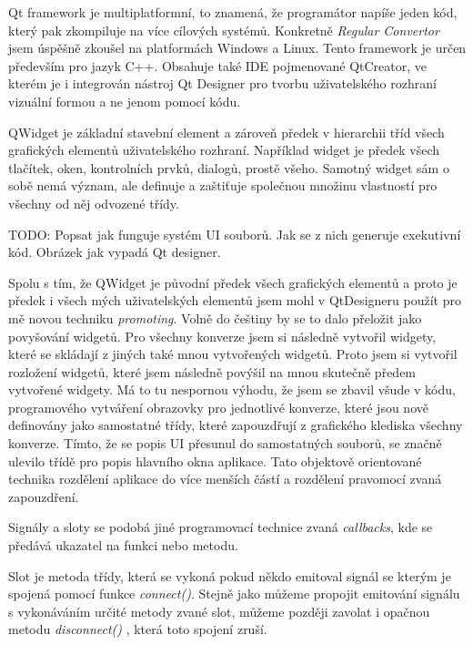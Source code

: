 
Qt framework je multiplatformní, to znamená, že programátor napíše jeden kód, který pak zkompiluje na více cílových systémů. Konkretně \textit{Regular Convertor} jsem úspěšně zkoušel na platformách Windows a Linux. Tento framework je určen především pro jazyk C++. Obsahuje také IDE pojmenované QtCreator, ve kterém je i integrován nástroj Qt Designer pro tvorbu uživatelského rozhraní vizuální formou a ne jenom pomocí kódu. 


QWidget je základní stavební element a zároveň předek v hierarchii tříd všech grafických elementů uživatelského rozhraní. Například widget je předek všech tlačítek, oken, kontrolních prvků, dialogů, prostě všeho. Samotný widget sám o sobě nemá význam, ale definuje a zaštiťuje společnou množinu vlastností pro všechny od něj odvozené třídy.


TODO: Popsat jak funguje systém UI souborů. Jak se z nich generuje exekutivní kód. Obrázek jak vypadá Qt designer.


Spolu s tím, že QWidget je původní předek všech grafických elementů a proto je předek i všech mých uživatelských elementů jsem mohl v QtDesigneru použít pro mě novou techniku \textit{promoting}. Volně do češtiny by se to dalo přeložit jako povyšování widgetů. Pro všechny konverze jsem si následně vytvořil widgety, které se skládají z jiných také mnou vytvořených widgetů. Proto jsem si vytvořil rozložení widgetů, které jsem následně povýšil na mnou skutečně předem vytvořené widgety.
Má to tu nespornou výhodu, že jsem se zbavil všude v kódu, programového vytváření obrazovky pro jednotlivé konverze, které jsou nově definovány jako samostatné třídy, které zapouzdřují z grafického klediska všechny konverze. Tímto, že se popis UI přesunul do samostatných souborů, se značně ulevilo třídě pro popis hlavního okna aplikace. Tato objektově orientované technika rozdělení aplikace do více menších částí a rozdělení pravomocí zvaná zapouzdření.


Signály a sloty se podobá jiné programovací technice zvaná \textit{callbacks}, kde se předává ukazatel na funkci nebo metodu. 

Slot je metoda třídy, která se vykoná pokud někdo emitoval signál se kterým je spojená pomocí funkce \textit{connect()}. Stejně jako můžeme propojit emitování signálu s vykonáváním určité metody zvané slot, můžeme později zavolat i opačnou metodu \textit{disconnect()} , která toto spojení zruší. 


